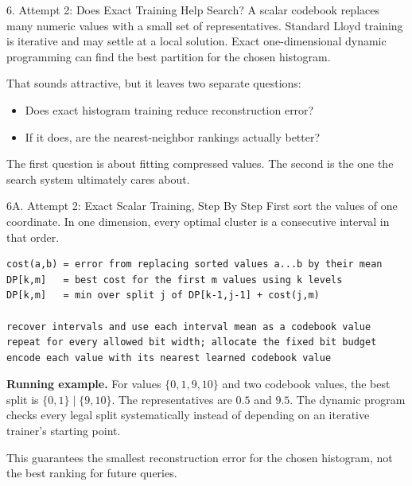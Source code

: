 \documentclass[
  ignorenonframetext,
  aspectratio=169,
]{beamer}
\providecommand{\tightlist}{%
  \setlength{\itemsep}{0pt}\setlength{\parskip}{0pt}}
\begin{document}
\begin{frame}{6. Attempt 2: Does Exact Training Help Search?}
\protect{}\label{6-attempt-2-does-exact-training-help-search}
A scalar codebook replaces many numeric values with a small set of
representatives. Standard Lloyd training is iterative and may settle at
a local solution. Exact one-dimensional dynamic programming can find the
best partition for the chosen histogram.

That sounds attractive, but it leaves two separate questions:

\begin{itemize}
\tightlist
\item
  Does exact histogram training reduce reconstruction error?
\item
  If it does, are the nearest-neighbor rankings actually better?
\end{itemize}

The first question is about fitting compressed values. The second is the
one the search system ultimately cares about.
\end{frame}

\begin{frame}[fragile]{6A. Attempt 2: Exact Scalar Training, Step By Step}
\small
First sort the values of one coordinate. In one dimension, every optimal
cluster is a consecutive interval in that order.

\begin{verbatim}
cost(a,b) = error from replacing sorted values a...b by their mean
DP[k,m]   = best cost for the first m values using k levels
DP[k,m]   = min over split j of DP[k-1,j-1] + cost(j,m)

recover intervals and use each interval mean as a codebook value
repeat for every allowed bit width; allocate the fixed bit budget
encode each value with its nearest learned codebook value
\end{verbatim}

\textbf{Running example.} For values $\{0,1,9,10\}$ and two codebook
values, the best split is $\{0,1\}\mid\{9,10\}$. The representatives are
$0.5$ and $9.5$. The dynamic program checks every legal split
systematically instead of depending on an iterative trainer's starting point.

This guarantees the smallest reconstruction error for the chosen histogram,
not the best ranking for future queries.
\end{frame}
\end{document}
